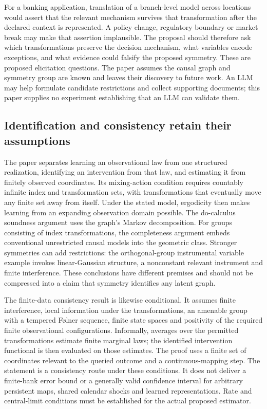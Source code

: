 For a banking application, translation of a branch-level model across
locations would assert that the relevant mechanism survives that
transformation after the declared context is represented. A policy change,
regulatory boundary or market break may make that assertion implausible.
The proposal should therefore ask which transformations preserve the
decision mechanism, what variables encode exceptions, and what evidence
could falsify the proposed symmetry. These are proposed elicitation questions.
The paper assumes the causal graph and symmetry group are known and leaves
their discovery to future work. An LLM may help formulate candidate
restrictions and collect supporting documents; this paper supplies no
experiment establishing that an LLM can validate them.
\citep{exec23_geometric_models}

\subsection{Identification and consistency retain their assumptions}
\label{exec23:structured-identification}

The paper separates learning an observational law from one structured
realization, identifying an intervention from that law, and estimating it
from finitely observed coordinates. Its mixing-action condition requires
countably infinite index and transformation sets, with transformations that
eventually move any finite set away from itself. Under the stated model,
ergodicity then makes learning from an expanding observation domain possible.
The do-calculus soundness argument uses the graph's Markov decomposition.
For groups consisting of index transformations, the completeness argument
embeds conventional unrestricted causal models into the geometric class.
Stronger symmetries can add restrictions: the orthogonal-group instrumental
variable example invokes linear-Gaussian structure, a nonconstant relevant
instrument and finite interference. These conclusions have different
premises and should not be compressed into a claim that symmetry identifies
any latent graph.
\citep{exec23_geometric_models}

The finite-data consistency result is likewise conditional. It assumes
finite interference, local information under the transformations, an
amenable group with a tempered F{\o}lner sequence, finite state spaces and
positivity of the required finite observational configurations. Informally,
averages over the permitted transformations estimate finite marginal laws;
the identified intervention functional is then evaluated on those estimates.
The proof uses a finite set of coordinates relevant to the queried outcome
and a continuous-mapping step. The statement is a consistency route under
these conditions. It does not deliver a finite-bank error bound or a
generally valid confidence interval for arbitrary persistent maps, shared
calendar shocks and learned representations. Rate and central-limit
conditions must be established for the actual proposed estimator.
\citep{exec23_geometric_models}

